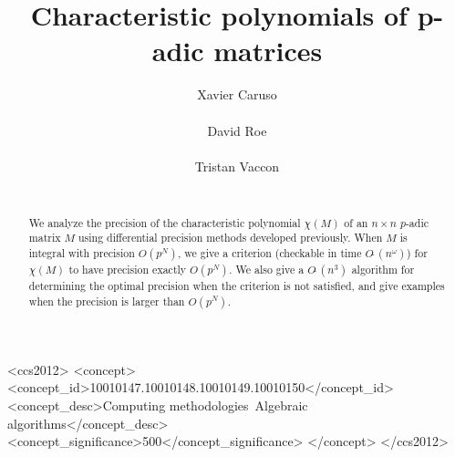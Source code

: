 \documentclass{sig-alternate-05-2015}
\newcommand{\softO}{O\tilde{~}}
\begin{document}
\newtheorem{theo}{Theorem}[section]
\newtheorem{lem}[theo]{Lemma}
\newtheorem{prop}[theo]{Proposition}
\newtheorem{cor}[theo]{Corollary}
\newtheorem{quest}[theo]{Question}
\newtheorem{conj}[theo]{Conjecture}
\theoremstyle{definition}
\newtheorem{rem}[theo]{Remark}
\newtheorem{ex}[theo]{Example}
\newtheorem{deftn}[theo]{Definition}

\title{Characteristic polynomials of p-adic matrices}

\author{
\alignauthor Xavier Caruso\\
  \\
\alignauthor David Roe\\
  \\
\alignauthor Tristan Vaccon\\
  \\
}

\maketitle

\begin{abstract}
We analyze the precision of the characteristic polynomial $\chi(M)$ of
an $n \times n$ $p$-adic matrix $M$ using differential precision methods
developed previously.  When $M$ is integral with precision $O(p^N)$,
we give a criterion (checkable in time $\softO(n^\omega)$) for
$\chi(M)$ to have precision exactly $O(p^N)$.  We also give a $\softO(n^3)$
algorithm for determining the optimal precision when the criterion is not
satisfied, and give examples when the precision is larger than $O(p^N)$.
\end{abstract}

\begin{CCSXML}
<ccs2012>
<concept>
<concept_id>10010147.10010148.10010149.10010150</concept_id>
<concept_desc>Computing methodologies~Algebraic algorithms</concept_desc>
<concept_significance>500</concept_significance>
</concept>
</ccs2012>
\end{CCSXML}

\vspace{-1mm}
\printccsdesc

\vspace{-1.5mm}
\end{document}
